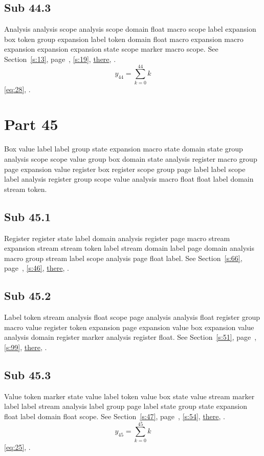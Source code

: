 \documentclass[11pt]{article}
\begin{document}
\subsection{Sub 44.3}\label{ss:44.3} Analysis analysis scope analysis scope domain float macro scope label expansion box token group expansion label token domain float macro expansion macro expansion expansion expansion state scope marker macro scope. See Section~\ref{s:13}, page~\pageref{ss:23.1}, \cref{s:19}, \hyperref[s:25]{there}, \cite{k93,k109}.
\begin{equation}y_{44}=\sum_{k=0}^{44}k\label{eq:44}\end{equation} \eqref{eq:28}, .
\section{Part 45}\label{s:45}
Box value label label group state expansion macro state domain state group analysis scope scope value group box domain state analysis register macro group page expansion value register box register scope group page label label scope label analysis register group scope value analysis macro float float label domain stream token.
\subsection{Sub 45.1}\label{ss:45.1} Register register state label domain analysis register page macro stream expansion stream stream token label stream domain label page domain analysis macro group stream label scope analysis page float label. See Section~\ref{s:66}, page~\pageref{ss:48.3}, \cref{s:46}, \hyperref[s:31]{there}, \cite{k68,k109}.
\subsection{Sub 45.2}\label{ss:45.2} Label token stream analysis float scope page analysis analysis float register group macro value register token expansion page expansion value box expansion value analysis domain register marker analysis register float. See Section~\ref{s:51}, page~\pageref{ss:26.3}, \cref{s:99}, \hyperref[s:20]{there}, \cite{k32,k63}.
\subsection{Sub 45.3}\label{ss:45.3} Value token marker state value label token value box state value stream marker label label stream analysis label group page label state group state expansion float label domain float scope. See Section~\ref{s:47}, page~\pageref{ss:37.1}, \cref{s:54}, \hyperref[s:68]{there}, \cite{k11,k5}.
\begin{equation}y_{45}=\sum_{k=0}^{45}k\label{eq:45}\end{equation} \eqref{eq:25}, .
\end{document}

